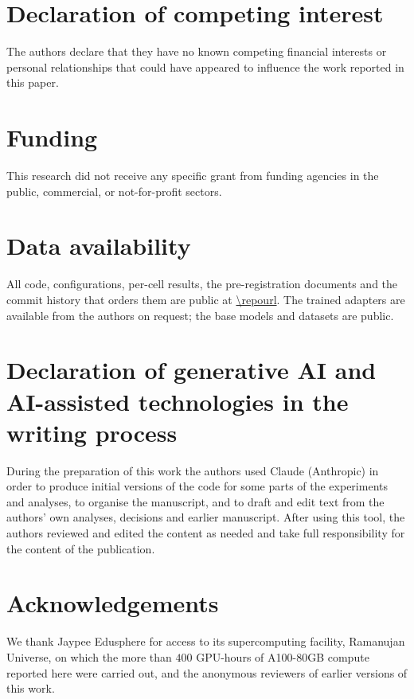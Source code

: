 

\section*{Declaration of competing interest}
The authors declare that they have no known competing financial interests or
personal relationships that could have appeared to influence the work reported
in this paper.

\section*{Funding}
This research did not receive any specific grant from funding agencies in the
public, commercial, or not-for-profit sectors.

\section*{Data availability}
All code, configurations, per-cell results, the pre-registration documents and
the commit history that orders them are public at \url{\repourl}. The trained
adapters are available from the authors on request; the base models and
datasets are public.

\section*{Declaration of generative AI and AI-assisted technologies in the
writing process}
During the preparation of this work the authors used Claude (Anthropic) in
order to produce initial versions of the code for some parts of the experiments
and analyses, to organise the manuscript, and to draft and edit text from the
authors' own analyses, decisions and earlier manuscript. After using this tool, the authors reviewed
and edited the content as needed and take full responsibility for the content
of the publication.

\section*{Acknowledgements}
We thank Jaypee Edusphere for access to its supercomputing facility, Ramanujan
Universe, on which the more than $400$ GPU-hours of A100-80GB compute reported
here were carried out, and the anonymous reviewers of earlier versions of this
work.

